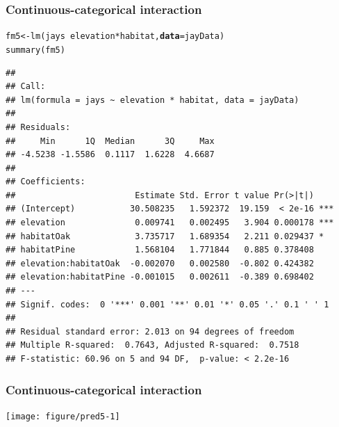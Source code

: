 \documentclass[color=usenames,dvipsnames]{beamer}\usepackage[]{graphicx}\usepackage[]{color}
\makeatletter
\newcommand{\hlopt}[1]{\textcolor[rgb]{0,0,0}{#1}}%
\newcommand{\hlstd}[1]{\textcolor[rgb]{0,0,0}{#1}}%
\newcommand{\hlkwb}[1]{\textcolor[rgb]{0,0.341,0.682}{#1}}%
\newcommand{\hlkwc}[1]{\textcolor[rgb]{0,0,0}{\textbf{#1}}}%
\newcommand{\hlkwd}[1]{\textcolor[rgb]{0.004,0.004,0.506}{#1}}%
\newenvironment{kframe}{%
 \def\at@end@of@kframe{}%
 \ifinner\ifhmode%
  \def\at@end@of@kframe{\end{minipage}}%
  \begin{minipage}{\columnwidth}%
 \fi\fi%
 \def\FrameCommand##1{\hskip\@totalleftmargin \hskip-\fboxsep
 \colorbox{shadecolor}{##1}\hskip-\fboxsep
     \hskip-\linewidth \hskip-\@totalleftmargin \hskip\columnwidth}%
 \MakeFramed {\advance\hsize-\width
   \@totalleftmargin\z@ \linewidth\hsize
   \@setminipage}}%
 {\par\unskip\endMakeFramed%
 \at@end@of@kframe}
\newenvironment{knitrout}{}{} %
\makeatother
\begin{document}
\begin{frame}[fragile]
  \frametitle{Continuous-categorical interaction}
\begin{knitrout}\tiny
{}\color{fgcolor}\begin{kframe}
\begin{alltt}
\hlstd{fm5} \hlkwb{<-} \hlkwd{lm}\hlstd{(jays} \hlopt{~} \hlstd{elevation}\hlopt{*}\hlstd{habitat,} \hlkwc{data}\hlstd{=jayData)}
\hlkwd{summary}\hlstd{(fm5)}
\end{alltt}
\begin{verbatim}
## 
## Call:
## lm(formula = jays ~ elevation * habitat, data = jayData)
## 
## Residuals:
##     Min      1Q  Median      3Q     Max 
## -4.5238 -1.5586  0.1117  1.6228  4.6687 
## 
## Coefficients:
##                        Estimate Std. Error t value Pr(>|t|)    
## (Intercept)           30.508235   1.592372  19.159  < 2e-16 ***
## elevation              0.009741   0.002495   3.904 0.000178 ***
## habitatOak             3.735717   1.689354   2.211 0.029437 *  
## habitatPine            1.568104   1.771844   0.885 0.378408    
## elevation:habitatOak  -0.002070   0.002580  -0.802 0.424382    
## elevation:habitatPine -0.001015   0.002611  -0.389 0.698402    
## ---
## Signif. codes:  0 '***' 0.001 '**' 0.01 '*' 0.05 '.' 0.1 ' ' 1
## 
## Residual standard error: 2.013 on 94 degrees of freedom
## Multiple R-squared:  0.7643,	Adjusted R-squared:  0.7518 
## F-statistic: 60.96 on 5 and 94 DF,  p-value: < 2.2e-16
\end{verbatim}
\end{kframe}
\end{knitrout}
\end{frame}




\begin{frame}[fragile]
  \frametitle{Continuous-categorical interaction}
\begin{knitrout}
\color{fgcolor}
\texttt{[image: figure/pred5-1]} 

\end{knitrout}
\end{frame}
\end{document}
